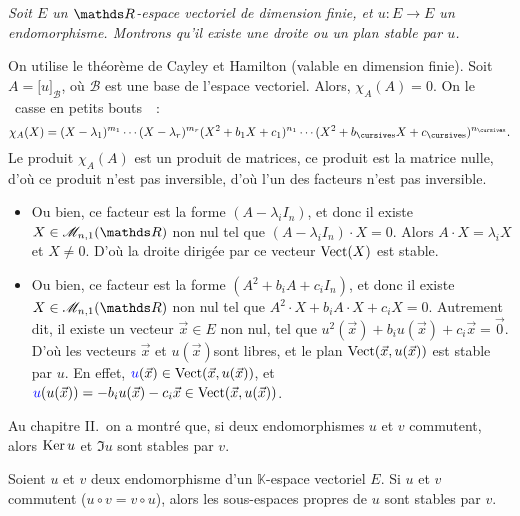 \begin{exo}
	{\slshape Soit $E$\/ un $\R$-espace vectoriel de dimension finie, et $u : E \to E$\/ un endomorphisme. Montrons qu'il existe une droite ou un plan stable par $u$.}

	On utilise le théorème de {\sc Cayley}\/ et {\sc Hamilton}\/ (valable en dimension finie).
	Soit $A = \big[u\big]_\mathscr{B}$, où $\mathscr{B}$\/ est une base de l'espace vectoriel. Alors, $\chi_A(A) = 0$.
	On le \guillemotleft~casse en petits bouts~\guillemotright\ : \[
		\chi_A(X) = (X-\lambda_1)^{m_1} \cdots(X - \lambda_r)^{m_r} (X^2 + b_1 X + c_1)^{n_1} \cdots (X^2 + b_\s X + c_\s)^{n_\s}
	.\]
	Le produit $\chi_A(A)$\/ est un produit de matrices, ce produit est la matrice nulle, d'où ce produit n'est pas inversible, d'où l'un des facteurs n'est pas inversible.
	\begin{itemize}
		\item Ou bien, ce facteur est la forme $(A - \lambda_i I_n)$, et donc il existe $X \in \mathscr{M}_{n,1}(\R)$\/ non nul tel que $(A - \lambda_i I_n)\cdot  X = 0$. Alors $A \cdot X = \lambda_i X$\/ et $X \neq 0$. D'où la droite dirigée par ce vecteur $\operatorname{Vect}(X)$\/ est stable.
		\item Ou bien, ce facteur est la forme $(A^2 + b_i A + c_i I_n)$, et donc il existe $X \in \mathscr{M}_{n,1}(\R)$\/ non nul tel que $A^2 \cdot X + b_i A\cdot X + c_i X = 0$. Autrement dit, il existe un vecteur $\vec{x} \in E$\/ non nul, tel que $u^2(\vec{x}) + b_i u(\vec{x}) + c_i \vec{x} = \vec{0}$.
			D'où les vecteurs $\vec{x}$\/ et $u(\vec{x})$\/\footnotemark sont libres, et le plan $\operatorname{Vect}(\vec{x},u(\vec{x}))$\/ est stable par $u$. En effet, ${\color{blue}u}(\vec{x}) \in \operatorname{Vect}(\vec{x}, u(\vec{x}))$, et ${\color{blue}u}(u(\vec{x})) = -b_i u(\vec{x}) - c_i \vec{x} \in \operatorname{Vect}(\vec{x}, u(\vec{x}))$.
	\end{itemize}
\end{exo}

\begin{rap}
	Au chapitre II.\ on a montré que, si deux endomorphismes $u$\/ et $v$\/ commutent, alors $\operatorname{Ker} u$\/ et $\Im u$\/ sont stables par $v$.
\end{rap}

\begin{prop}
	Soient $u$\/ et $v$\/ deux endomorphisme d'un $\mathds{K}$-espace vectoriel $E$.
	Si $u$\/ et $v$\/ commutent ($u  \circ v = v  \circ u$), alors les sous-espaces propres de $u$\/ sont stables par $v$.
\end{prop}

